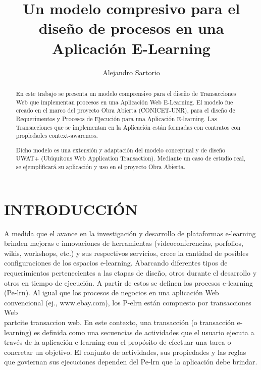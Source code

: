 \documentclass[12 pt,a4paper]{llncs}
\begin{document}
\title{Un modelo compresivo para el diseño de procesos en una Aplicación E-Learning }

\author{Alejandro Sartorio}



\maketitle


\begin{abstract}
En este trabajo se presenta un modelo comprensivo para el diseño de Transacciones Web que implementan procesos en una Aplicación Web E-Learning. El modelo fue creado en el marco del proyecto Obra Abierta (CONICET-UNR), para el diseño de Requerimentos y Procesos de Ejecución para una Aplicación E-learning. Las Transacciones que se implementan en la Aplicación están formadas con contratos con propiedades context-awareness.

Dicho modelo es una extensión y adaptación del modelo conceptual y de diseño UWAT+ (Ubiquitous Web Application Transaction). Mediante un caso de estudio real, se ejemplificará su aplicación y uso en el proyecto Obra Abierta. 

\end{abstract}


%

\newpage

\section {INTRODUCCIÓN} \label{intro}

A medida que el avance en la investigación y desarrollo de plataformas e-learning brinden  mejoras e innovaciones de herramientas (videoconferencias, porfolios, wikis, workshops, etc.) y sus respectivos servicios,  crece la cantidad de posibles configuraciones de los espacios e-learning.  Abarcando diferentes tipos de requerimientos pertenecientes a las etapas de diseño, otros durante el desarrollo y otros en tiempo de ejecución. A partir de estos se definen los procesos e-learning (Pe-lrn). Al igual que los procesos de negocios en una aplicación Web convencional (ej., www.ebay.com), los P-elrn están compuesto por transacciones Web \\part{cite}
{transaccion web}. En este contexto, una transacción (o transacción e-learning) es definida como una secuencias de actividades que el usuario ejecuta a través de la aplicación e-learning con el propósito de efectuar una tarea o concretar un objetivo. El conjunto de actividades, sus propiedades y las reglas que goviernan sus ejecuciones dependen del Pe-lrn que la aplicación debe brindar.
\end{document}
